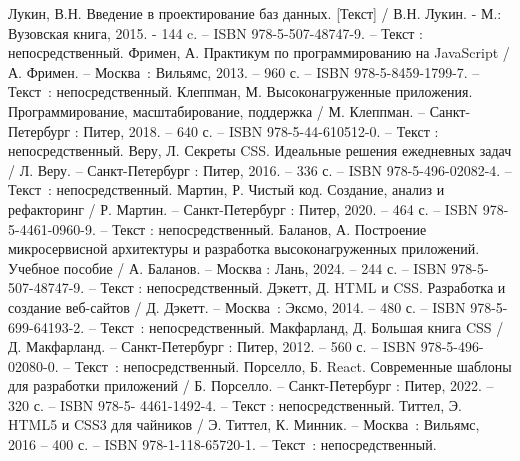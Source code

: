 
\begin{thebibliography}{9}
	 Лукин, В.Н. Введение в проектирование баз данных. [Текст] / В.Н. Лукин. - М.: Вузовская книга, 2015. - 144 c. – ISBN 978-5-507-48747-9. – Текст : непосредственный.
     Фримен, А. Практикум по программированию на JavaScript / А. Фримен. – Москва~: Вильямс, 2013. – 960 с. – ISBN 978-5-8459-1799-7. – Текст~: непосредственный.
     Клеппман, М. Высоконагруженные приложения. Программирование, масштабирование, поддержка / М. Клеппман. – Санкт-Петербург : Питер, 2018. – 640 с. – ISBN 978-5-44-610512-0. – Текст : непосредственный.
     Веру, Л. Секреты CSS. Идеальные решения ежедневных задач / Л. Веру. – Санкт-Петербург : Питер, 2016. – 336 с. – ISBN 978-5-496-02082-4. – Текст~: непосредственный.
    	Мартин, Р. Чистый код. Создание, анализ и рефакторинг / Р. Мартин. – Санкт-Петербург : Питер, 2020. – 464 с. – ISBN 978-5-4461-0960-9. –
    Текст : непосредственный.
	 Баланов, А. Построение микросервисной архитектуры и разработка
	высоконагруженных приложений. Учебное пособие / А. Баланов. – Москва :
	Лань, 2024. – 244 с. – ISBN 978-5-507-48747-9. – Текст : непосредственный.
		Дэкетт, Д. HTML и CSS. Разработка и создание веб-сайтов / Д. Дэкетт. – Москва~: Эксмо, 2014. – 480 с. – ISBN 978-5-699-64193-2. – Текст~: непосредственный.
		Макфарланд, Д. Большая книга CSS / Д. Макфарланд. – Санкт-Петербург : Питер, 2012. – 560 с. – ISBN 978-5-496-02080-0. – Текст~: непосредственный.
		Порселло, Б. React. Современные шаблоны для разработки приложений / Б. Порселло. – Санкт-Петербург : Питер, 2022. – 320 с. – ISBN 978-5-
	4461-1492-4. – Текст : непосредственный.
		Титтел, Э. HTML5 и CSS3 для чайников / Э. Титтел, К. Минник. – Москва~: Вильямс, 2016 – 400 с. – ISBN 978-1-118-65720-1. – Текст~: непосредственный.    
\end{thebibliography}
